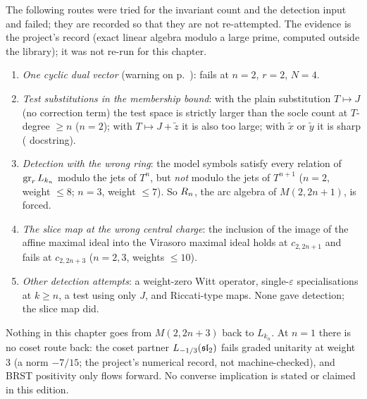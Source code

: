\begin{warning}[title={Dead ends}]\label{l29:warn:deadends}
The following routes were tried for the invariant count and the detection input and failed; they are recorded so that
they are not re-attempted. The evidence is the project's record (exact linear algebra modulo a large prime, computed outside the
library); it was not re-run for this chapter.
\begin{enumerate}
\item \emph{One cyclic dual vector} (warning on p.~\pageref{l29:warn:cyclic}): fails at $n=2$, $r=2$, $N=4$.
\item \emph{Test substitutions in the membership bound}: with the plain substitution $T\mapsto J$ (no correction term)
  the test space is strictly larger than the socle count at $T$-degree $\ge n$ ($n=2$); with $T\mapsto J+\tilde z$ it is
  also too large; with $\tilde x$ or $\tilde y$ it is sharp ( docstring).
\item \emph{Detection with the wrong ring}: the model symbols satisfy every relation of $\operatorname{gr}_rL_{k_n}$ modulo the
  jets of $T^n$, but \emph{not} modulo the jets of $T^{n+1}$ ($n=2$, weight $\le8$; $n=3$, weight $\le7$). So $R_n$,
  the arc algebra of $M(2,2n+1)$, is forced.
\item \emph{The slice map at the wrong central charge}: the inclusion of the image of the affine maximal ideal into the
  Virasoro maximal ideal holds at $c_{2,2n+1}$ and fails at $c_{2,2n+3}$ ($n=2,3$, weights $\le10$).
\item \emph{Other detection attempts}: a weight-zero Witt operator, single-$\varepsilon$
  specialisations at $k\ge n$, a test using only $J$, and Riccati-type maps. None gave detection; the slice map did.
\end{enumerate}
\end{warning}

\begin{warning}[title={The converse is not proved}]\label{l29:warn:converse}
Nothing in this chapter goes from $M(2,2n+3)$ back to $L_{k_n}$. At $n=1$ there is no coset route back: the coset partner
$L_{-1/3}(\mathfrak{sl}_2)$ fails graded unitarity at weight $3$ (a norm $-7/15$; the project's numerical record, not
machine-checked), and BRST positivity only flows forward.
No converse implication is stated or claimed in this edition.
\end{warning}

